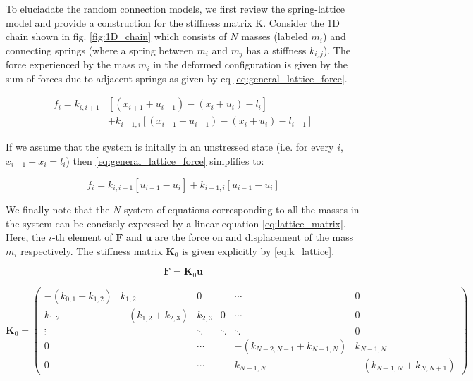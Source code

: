 \documentclass{article}
\begin{document}
To eluciadate the random connection models, we first review the spring-lattice model and provide a construction 
for the stiffness matrix K.
Consider the 1D chain shown in fig. \ref{fig:1D_chain} which consists of $N$ masses (labeled $m_i$) and connecting springs (where a spring between $m_i$ and $m_j$ has a stiffness $k_{i,j}$).
The force experienced by the mass $m_i$ in the deformed configuration is given by the sum of forces due to adjacent springs as given by eq \ref{eq:general_lattice_force}.

\begin{equation}\label{eq:general_lattice_force}
\begin{split}
	f_i = k_{i,i+1}&\left[ \left(x_{i+1} + u_{i+1} \right)- \left(x_{i} + u_{i} \right)  - l_i\right] \\
		 &+ k_{i-1,i}\left[ \left(x_{i-1} + u_{i-1} \right)- \left(x_{i} + u_{i} \right)  - l_{i-1}\right]
\end{split}
\end{equation}


If we assume that the system is initally in an unstressed state 
(i.e. for every $i$, $x_{i+1} - x_{i} = l_i$) then \ref{eq:general_lattice_force} simplifies to:

\begin{equation}\label{eq:lattice_force}
	f_i = k_{i,i+1}\left[u_{i+1} - u_i\right] + k_{i-1, i}\left[u_{i-1} - u_{i}\right]
\end{equation}

We finally note that the $N$ system of equations corresponding to all the masses in the system can be concisely expressed by a linear equation \ref{eq:lattice_matrix}.
Here, the $i$-th element of $\bm{F}$ and $\bm{u}$ are the force on and displacement of the mass $m_i$ respectively.
The stiffness matrix $\bm{K}_0$ is given explicitly by \ref{eq:k_lattice}.

\begin{equation}\label{eq:lattice_matrix}
	\bm{F} = \bm{K}_0\bm{u} 
\end{equation}

\begin{equation}\label{eq:k_lattice}
		\bm{K}_0 = 
\begin{pmatrix}
	-(k_{0,1} + k_{1,2}) & k_{1,2} & 0 & &\cdots & 0 \\
	k_{1,2} & -(k_{1,2} + k_{2,3}) & k_{2,3} & 0 & \cdots & 0 \\
	\vdots & &\ddots& \ddots  & \ddots & 0\\
	0& & \cdots && -(k_{N-2, N-1} + k_{N-1, N}) & k_{N-1, N}\\
	0 & & \cdots & & k_{N-1, N}& -(k_{N-1, N} + k_{N, N+1})
\end{pmatrix} 
\end{equation}
\end{document}
